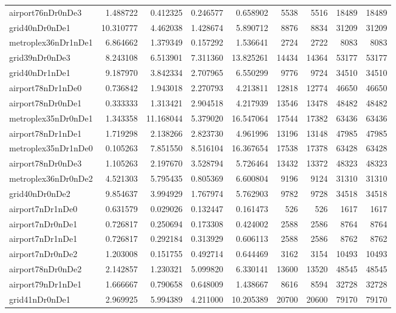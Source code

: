 \begin{longtable}{|l|r|r|r|r|r|r|r|r|}
airport76nDr0nDe3 & 1.488722 & 0.412325 & 0.246577 & 0.658902 & 5538 & 5516 & 18489 & 18489 \\
grid40nDr0nDe1 & 10.310777 & 4.462038 & 1.428674 & 5.890712 & 8876 & 8834 & 31209 & 31209 \\
metroplex36nDr1nDe1 & 6.864662 & 1.379349 & 0.157292 & 1.536641 & 2724 & 2722 & 8083 & 8083 \\
grid39nDr0nDe3 & 8.243108 & 6.513901 & 7.311360 & 13.825261 & 14434 & 14364 & 53177 & 53177 \\
grid40nDr1nDe1 & 9.187970 & 3.842334 & 2.707965 & 6.550299 & 9776 & 9724 & 34510 & 34510 \\
airport78nDr1nDe0 & 0.736842 & 1.943018 & 2.270793 & 4.213811 & 12818 & 12774 & 46650 & 46650 \\
airport78nDr0nDe1 & 0.333333 & 1.313421 & 2.904518 & 4.217939 & 13546 & 13478 & 48482 & 48482 \\
metroplex35nDr0nDe1 & 1.343358 & 11.168044 & 5.379020 & 16.547064 & 17544 & 17382 & 63436 & 63436 \\
airport78nDr1nDe1 & 1.719298 & 2.138266 & 2.823730 & 4.961996 & 13196 & 13148 & 47985 & 47985 \\
metroplex35nDr1nDe0 & 0.105263 & 7.851550 & 8.516104 & 16.367654 & 17538 & 17378 & 63428 & 63428 \\
airport78nDr0nDe3 & 1.105263 & 2.197670 & 3.528794 & 5.726464 & 13432 & 13372 & 48323 & 48323 \\
metroplex36nDr0nDe2 & 4.521303 & 5.795435 & 0.805369 & 6.600804 & 9196 & 9124 & 31310 & 31310 \\
grid40nDr0nDe2 & 9.854637 & 3.994929 & 1.767974 & 5.762903 & 9782 & 9728 & 34518 & 34518 \\
airport7nDr1nDe0 & 0.631579 & 0.029026 & 0.132447 & 0.161473 & 526 & 526 & 1617 & 1617 \\
airport7nDr0nDe1 & 0.726817 & 0.250694 & 0.173308 & 0.424002 & 2588 & 2586 & 8764 & 8764 \\
airport7nDr1nDe1 & 0.726817 & 0.292184 & 0.313929 & 0.606113 & 2588 & 2586 & 8762 & 8762 \\
airport7nDr0nDe2 & 1.203008 & 0.151755 & 0.492714 & 0.644469 & 3162 & 3154 & 10493 & 10493 \\
airport78nDr0nDe2 & 2.142857 & 1.230321 & 5.099820 & 6.330141 & 13600 & 13520 & 48545 & 48545 \\
airport79nDr1nDe1 & 1.666667 & 0.790658 & 0.648009 & 1.438667 & 8616 & 8594 & 32728 & 32728 \\
grid41nDr0nDe1 & 2.969925 & 5.994389 & 4.211000 & 10.205389 & 20700 & 20600 & 79170 & 79170 \\

\end{longtable}
